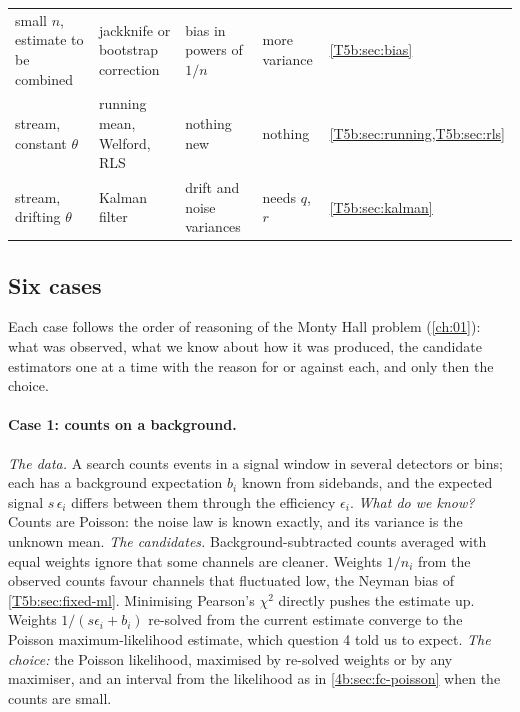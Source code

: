 \begin{table}[htbp]
\begin{tabularx}{\linewidth}{@{}>{\raggedright}p{25mm}>{\raggedright}p{23mm}>{\raggedright}X>{\raggedright}X>{\raggedright\arraybackslash}p{21mm}@{}}
small $n$, estimate to be combined & jackknife or bootstrap correction & bias in powers of $1/n$ & more variance & \cref{T5b:sec:bias}\\
stream, constant $\theta$ & running mean, Welford, RLS & nothing new & nothing & \cref{T5b:sec:running,T5b:sec:rls}\\
stream, drifting $\theta$ & Kalman filter & drift and noise variances & needs $q$, $r$ & \cref{T5b:sec:kalman}\\
\bottomrule
\end{tabularx}
\end{table}

\subsection{Six cases}
\label{T5b:sec:cases}

Each case follows the order of reasoning of the Monty Hall problem
(\cref{ch:01}): what was observed, what we know about how it was produced, the
candidate estimators one at a time with the reason for or against each, and
only then the choice.

\paragraph{Case 1: counts on a background.}
\emph{The data.} A search counts events in a signal window in several
detectors or bins; each has a background expectation $b_i$ known from
sidebands, and the expected signal $s\,\epsilon_i$ differs between them through
the efficiency $\epsilon_i$. \emph{What do we know?} Counts are Poisson: the
noise law is known exactly, and its variance is the unknown mean.
\emph{The candidates.} Background-subtracted counts averaged with equal
weights ignore that some channels are cleaner. Weights $1/n_i$ from the
observed counts favour channels that fluctuated low, the Neyman bias
of \cref{T5b:sec:fixed-ml}. Minimising Pearson's $\chi^2$ directly pushes the
estimate up. Weights $1/(s\epsilon_i+b_i)$ re-solved from the current estimate
converge to the Poisson maximum-likelihood estimate, which question 4 told us
to expect. \emph{The choice:} the Poisson likelihood, maximised by re-solved
weights or by any maximiser, and an interval from the likelihood as in
\cref{4b:sec:fc-poisson} when the counts are small.

